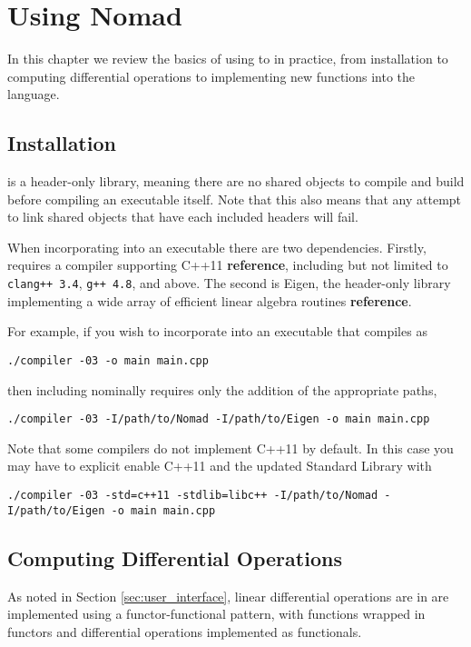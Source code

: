 \chapter{Using Nomad}

In this chapter we review the basics of using \nomad to in practice, 
from installation to computing differential operations to implementing
new functions into the language.

\section{Installation}

\nomad is a header-only library, meaning there are no shared objects
to compile and build before compiling an executable itself.  Note that
this also means that any attempt to link shared objects that have each
included \nomad headers will fail.

When incorporating \nomad into an executable there are two
dependencies.  Firstly, \nomad requires a compiler supporting C++11 
\textbf{reference}, including but not limited to \verb|clang++ 3.4|,
\verb|g++ 4.8|, and above.  The second is Eigen, the header-only 
library implementing a wide array of efficient linear algebra
routines \textbf{reference}.

For example, if you wish to incorporate \nomad into an executable
that compiles as
%
\begin{verbatim}
./compiler -03 -o main main.cpp
\end{verbatim}
%
then including \nomad nominally requires only the addition of the 
appropriate paths,
%
\begin{verbatim}
./compiler -03 -I/path/to/Nomad -I/path/to/Eigen -o main main.cpp
\end{verbatim}
%
Note that some compilers do not implement C++11 by default.  In
this case you may have to explicit enable C++11 and the updated
Standard Library with
%
\begin{verbatim}
./compiler -03 -std=c++11 -stdlib=libc++ -I/path/to/Nomad -I/path/to/Eigen -o main main.cpp
\end{verbatim}

\section{Computing Differential Operations}

As noted in Section \ref{sec:user_interface}, linear differential operations 
are in \nomad are implemented using a functor-functional pattern, with 
functions wrapped in functors and differential operations implemented 
as functionals.

